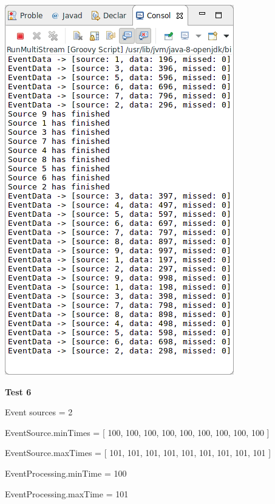 \includegraphics[width=\textwidth/2]{img/screenshots/9-2-5.png}

\textbf{Test 6}

Event sources = 2

EventSource.minTimes = [ 100, 100, 100, 100, 100, 100, 100, 100, 100 ]

EventSource.maxTimes = [ 101, 101, 101, 101, 101, 101, 101, 101, 101 ]

EventProcessing.minTime = 100

EventProcessing.maxTime = 101

